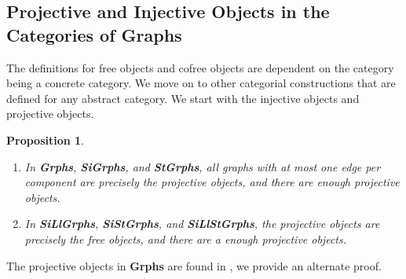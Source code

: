 \documentclass[11pt]{article}
\newtheorem{proposition}[theorem]{Proposition}
\begin{document}
\subsection{Projective and Injective Objects in the Categories of Graphs}
\indent The definitions for free objects and cofree objects are dependent on the category being a concrete category. We move on to other categorial constructions that are defined for any abstract category. We start with the injective objects and projective objects.
\begin{proposition}
\begin{enumerate}
\item In \textbf{Grphs}, \textbf{SiGrphs}, and \textbf{StGrphs}, all graphs with at most one edge per component are precisely the projective objects, and there are enough projective objects.
\item In \textbf{SiLlGrphs}, \textbf{SiStGrphs}, and \textbf{SiLlStGrphs}, the projective objects are precisely the free objects, and there are a enough projective objects.
\end{enumerate}
\end{proposition}
The projective objects in \textbf{Grphs} are found in \cite{KKWil}, we provide an alternate proof.
\end{document}
